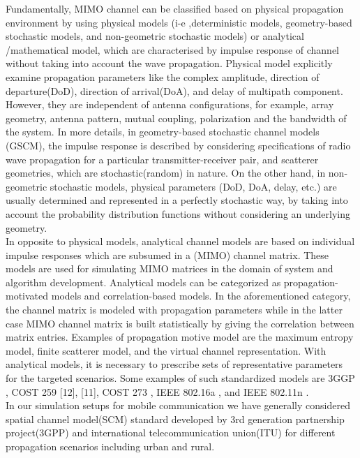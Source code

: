 Fundamentally, MIMO channel can be classified based on physical propagation environment by using physical models (i-e ,deterministic models, geometry-based stochastic
models, and non-geometric stochastic models) or  analytical /mathematical model, which are characterised by impulse response of channel without taking into account the wave propagation. Physical model explicitly examine propagation parameters like the complex amplitude, direction of departure(DoD), direction of arrival(DoA), and delay of multipath component. However, they are independent of antenna configurations, for example, array geometry, antenna pattern, mutual coupling, polarization and the bandwidth of the system\cite{chan_model}.
In more details, in geometry-based stochastic channel models (GSCM), the impulse response is described by considering specifications of radio wave propagation for a particular transmitter-receiver pair, and scatterer geometries, which are  stochastic(random)  in nature. On the other hand, in non-geometric stochastic models, physical parameters (DoD, DoA, delay, etc.) are usually determined and represented in  a perfectly stochastic way, by taking into account the probability distribution functions without considering an underlying geometry.\\
In opposite to physical models, analytical channel models are based on individual impulse responses which are
subsumed in a (MIMO) channel matrix. These models are used for simulating MIMO matrices in the domain of system and algorithm development. Analytical models can be categorized as propagation-motivated models and correlation-based models.
In the aforementioned category, the channel matrix is modeled with propagation parameters while in the latter case MIMO channel matrix is built statistically by giving the correlation between matrix entries. Examples of propagation motive model are the maximum entropy model\cite{channel_model_entropy}, finite scatterer model\cite{channel_model_analy1},  and the virtual channel representation\cite{channel_model_virtual}. 
With analytical models, it is necessary to prescribe sets of representative parameters for the targeted scenarios. Some examples of such standardized models are 3GGP \cite{SCM}, COST 259 [12], [11], COST 273 \cite{cost273_ch_model}, IEEE 802.16a \cite{IEEE_802.16},
and IEEE 802.11n \cite{IEEE_802.11}.\\
In our simulation setups for mobile communication we have generally considered spatial channel model(SCM) standard developed by 3rd generation partnership project(3GPP) and international telecommunication union(ITU) for different propagation scenarios including urban and rural. 

